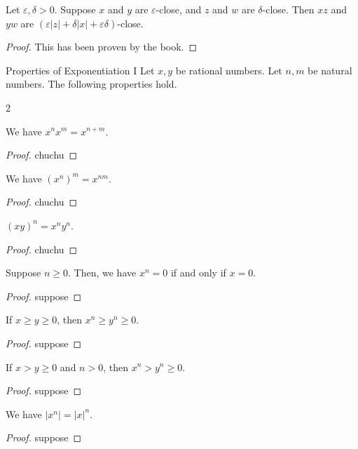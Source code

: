 \begin{proposition}
    Let $\varepsilon, \delta > 0.$ Suppose $x$ and $y$ are $\varepsilon$-close, and $z$ and $w$ are $\delta$-close. Then $xz$ and $yw$ are $(\varepsilon \lvert z \rvert + \delta \lvert x \rvert + \varepsilon \delta)$-close.
\end{proposition}
\begin{proof}
    This has been proven by the book.
\end{proof}

\begin{problem}{Properties of Exponentiation I}
Let $x, y$ be rational numbers. Let $n, m$ be natural numbers. The following properties hold.
\end{problem}

\begin{multicols}{2}
\begin{proposition} We have $x^n x^m = x^{n + m}$.
\end{proposition}
\begin{proof}
    chuchu
\end{proof}

\begin{proposition} We have $(x^n)^m=x^{nm}.$
\end{proposition}
\begin{proof}
    chuchu
\end{proof}

\begin{proposition} $(xy)^n=x^n y^n.$
\end{proposition}
\begin{proof}
    chuchu
\end{proof}
\begin{proposition}
    Suppose $n \geq 0.$ Then, we have $x^n = 0$ if and only if $x = 0.$
\end{proposition}
\begin{proof}
    suppose
\end{proof}

\begin{proposition}
    If $x \geq y \geq 0$, then $x^n \geq y ^ n \geq 0$. 
\end{proposition}
\begin{proof}
    suppose
\end{proof}

\begin{proposition}
    If $x > y \geq 0$ and $n > 0$, then $x ^n > y^n \geq 0.$
\end{proposition}
\begin{proof}
    suppose
\end{proof}
\begin{proposition}
    We have $\lvert x^n \rvert = \lvert x \rvert ^n$.
\end{proposition}
\begin{proof}
    suppose
\end{proof}
\end{multicols}


